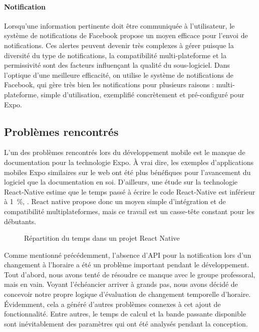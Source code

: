         \paragraph{Notification}
        Lorsqu'une information pertinente doit être communiquée à l'utilisateur, le système de notifications de Facebook propose un moyen efficace pour l'envoi de notifications. Ces alertes peuvent devenir très complexes à gérer puisque la diversité du type de notifications, la compatibilité multi-plateforme et la permissivité sont des facteurs influençant la qualité du sous-logiciel. Dans l'optique d'une meilleure efficacité, on utilise le système de notifications de Facebook, qui gère très bien les notifications pour plusieurs raisons : multi-plateforme, simple d'utilisation, exemplifié concrètement et pré-configuré pour Expo.
    
    \subsection{Problèmes rencontrés}
    L'un des problèmes rencontrés lors du développement mobile est le manque de documentation pour la technologie Expo. À vrai dire, les exemples d'applications mobiles Expo similaires sur le web ont été plus bénéfiques pour l'avancement du logiciel que la documentation en soi. D'ailleurs, une étude sur la technologie React-Native estime que le temps passé à écrire le code React-Native est inférieur à 1~\%, \cite{react}. React native propose donc un moyen simple d'intégration et de compatibilité multiplateformes, mais ce travail est un casse-tête constant pour les débutants.

    \begin{figure}[hp] \centering
        
        \caption{Répartition du temps dans un projet React Native}
        \label{fig.react}
    \end{figure}
    
    Comme mentionné précédemment, l'absence d'API pour la notification lors d'un changement à l'horaire a été un problème important pendant le développement. Tout d'abord, nous avons tenté de résoudre ce manque avec le groupe professoral, mais en vain. Voyant l'échéancier arriver à grands pas, nous avons décidé de concevoir notre propre logique d'évaluation de changement temporelle d'horaire. Évidemment, cela a généré d'autres problèmes connexes à cet ajout de fonctionnalité. Entre autres, le temps de calcul et la bande passante disponible sont inévitablement des paramètres qui ont été analysés pendant la conception.
    
